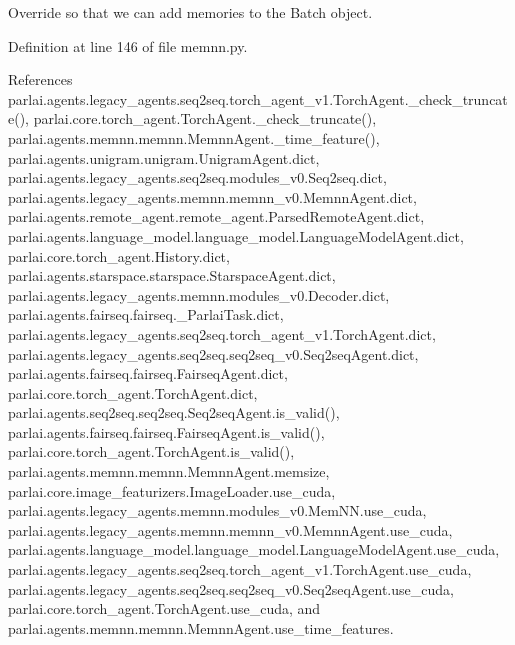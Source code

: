\begin{DoxyVerb}Override so that we can add memories to the Batch object.\end{DoxyVerb}
 

Definition at line 146 of file memnn.\+py.



References parlai.\+agents.\+legacy\+\_\+agents.\+seq2seq.\+torch\+\_\+agent\+\_\+v1.\+Torch\+Agent.\+\_\+check\+\_\+truncate(), parlai.\+core.\+torch\+\_\+agent.\+Torch\+Agent.\+\_\+check\+\_\+truncate(), parlai.\+agents.\+memnn.\+memnn.\+Memnn\+Agent.\+\_\+time\+\_\+feature(), parlai.\+agents.\+unigram.\+unigram.\+Unigram\+Agent.\+dict, parlai.\+agents.\+legacy\+\_\+agents.\+seq2seq.\+modules\+\_\+v0.\+Seq2seq.\+dict, parlai.\+agents.\+legacy\+\_\+agents.\+memnn.\+memnn\+\_\+v0.\+Memnn\+Agent.\+dict, parlai.\+agents.\+remote\+\_\+agent.\+remote\+\_\+agent.\+Parsed\+Remote\+Agent.\+dict, parlai.\+agents.\+language\+\_\+model.\+language\+\_\+model.\+Language\+Model\+Agent.\+dict, parlai.\+core.\+torch\+\_\+agent.\+History.\+dict, parlai.\+agents.\+starspace.\+starspace.\+Starspace\+Agent.\+dict, parlai.\+agents.\+legacy\+\_\+agents.\+memnn.\+modules\+\_\+v0.\+Decoder.\+dict, parlai.\+agents.\+fairseq.\+fairseq.\+\_\+\+Parlai\+Task.\+dict, parlai.\+agents.\+legacy\+\_\+agents.\+seq2seq.\+torch\+\_\+agent\+\_\+v1.\+Torch\+Agent.\+dict, parlai.\+agents.\+legacy\+\_\+agents.\+seq2seq.\+seq2seq\+\_\+v0.\+Seq2seq\+Agent.\+dict, parlai.\+agents.\+fairseq.\+fairseq.\+Fairseq\+Agent.\+dict, parlai.\+core.\+torch\+\_\+agent.\+Torch\+Agent.\+dict, parlai.\+agents.\+seq2seq.\+seq2seq.\+Seq2seq\+Agent.\+is\+\_\+valid(), parlai.\+agents.\+fairseq.\+fairseq.\+Fairseq\+Agent.\+is\+\_\+valid(), parlai.\+core.\+torch\+\_\+agent.\+Torch\+Agent.\+is\+\_\+valid(), parlai.\+agents.\+memnn.\+memnn.\+Memnn\+Agent.\+memsize, parlai.\+core.\+image\+\_\+featurizers.\+Image\+Loader.\+use\+\_\+cuda, parlai.\+agents.\+legacy\+\_\+agents.\+memnn.\+modules\+\_\+v0.\+Mem\+N\+N.\+use\+\_\+cuda, parlai.\+agents.\+legacy\+\_\+agents.\+memnn.\+memnn\+\_\+v0.\+Memnn\+Agent.\+use\+\_\+cuda, parlai.\+agents.\+language\+\_\+model.\+language\+\_\+model.\+Language\+Model\+Agent.\+use\+\_\+cuda, parlai.\+agents.\+legacy\+\_\+agents.\+seq2seq.\+torch\+\_\+agent\+\_\+v1.\+Torch\+Agent.\+use\+\_\+cuda, parlai.\+agents.\+legacy\+\_\+agents.\+seq2seq.\+seq2seq\+\_\+v0.\+Seq2seq\+Agent.\+use\+\_\+cuda, parlai.\+core.\+torch\+\_\+agent.\+Torch\+Agent.\+use\+\_\+cuda, and parlai.\+agents.\+memnn.\+memnn.\+Memnn\+Agent.\+use\+\_\+time\+\_\+features.



